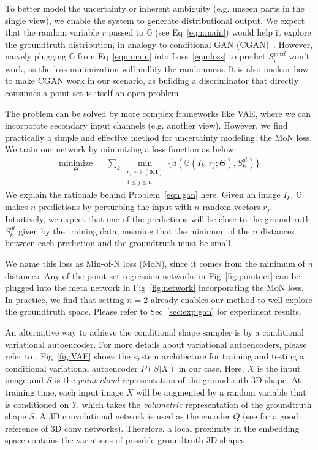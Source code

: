 \documentclass[10pt,twocolumn,letterpaper]{article}
\begin{document}
To better model the uncertainty or inherent ambiguity (e.g. unseen parts in the single view), we enable the system to generate distributional output. We expect that the random variable $r$ passed to $\mathbb{G}$ (see Eq~\eqref{eqn:main}) would help it explore the groundtruth distribution, in analogy to conditional GAN (CGAN)~\cite{mirza2014conditional}. However, naively plugging $\mathbb{G}$ from Eq~\eqref{eqn:main} into Loss~\eqref{eqn:loss} to predict $S_i^{pred}$ won't work, as the loss minimization will nullify the randomness. It is also unclear how to make CGAN work in our scenario, as building a discriminator that directly consumes a point set is itself an open problem. 

The problem can be solved by more complex frameworks like VAE, where we can incorporate secondary input channels (e.g. another view). However, we find practically a simple and effective method for uncertainty modeling: the MoN loss. We train our network by minimizing a loss function as below:
\begin{equation}
    \begin{aligned}
    \underset{\Theta}{\mbox{minimize}} 
    && 
    \sum_k 
        \min_{
            \substack{r_j\sim \mathbb{N}(\mathbf{0}, \mathbf{I})\\1\le j\le n}
        }
        \{
            d(\mathbb{G}(I_k, r_j;\Theta), S_k^{gt})
        \}
    \end{aligned} 
    \label{eqn:gan}
\end{equation}We explain the rationale behind Problem~\eqref{eqn:gan} here. Given an image $I_k$, $\mathbb{G}$ makes $n$ predictions by perturbing the input with $n$ random vectors $r_j$. Intuitively, we expect that one of the predictions will be close to the groundtruth $S_k^{gt}$ given by the training data, meaning that the minimum of the $n$ distances between each prediction and the groundtruth must be small. 

We name this loss as Min-of-N loss (MoN), since it comes from the minimum of $n$ distances. Any of the point set regression networks in Fig~\ref{fig:pointnet} can be plugged into the meta network in Fig~\ref{fig:network} incorporating the MoN loss. In practice, we find that setting $n=2$ already enables our method to well explore the groundtruth space.  Please refer to Sec~\ref{sec:exp:gan} for experiment results.

An alternative way to achieve the conditional shape sampler is by a conditional variational autoencoder. For more details about variational autoencoders, please refer to \cite{doersch2016tutorial}.  Fig~\ref{fig:VAE} shows the system architecture for training and testing a conditional variational autoencoder $P(S|X)$ in our case. Here, $X$ is the input image and $S$ is the \emph{point cloud} representation of the groundtruth 3D shape. At training time, each input image $X$ will be augmented by a random variable that is conditioned on $Y$, which takes the \emph{volumetric} representation of the groundtruth shape $S$. A 3D convolutional network is used as the encoder $Q$ (see \cite{maturana2015voxnet} for a good reference of 3D conv networks). Therefore, a local proximity in the embedding space contains the variations of possible groundtruth 3D shapes.
\end{document}
